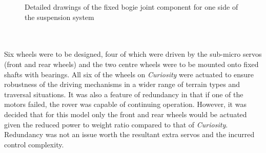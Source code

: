         \begin{figure}[H]
        \centering
        \caption[Detailed drawings of the fixed bogie joint component for one side of the suspension system]{Detailed drawings of the fixed bogie joint component for one side of the suspension system}
        \label{fig:mechDesign-bogieJointFixedDetail}
        \end{figure}
        
      \\\\
        Six wheels were to be designed, four of which were driven by the sub-micro servos (front and rear wheels) and the two centre wheels were to be mounted onto fixed shafts with bearings. All six of the wheels on \textit{Curiosity} were actuated to ensure robustness of the driving mechanisms in a wider range of terrain types and traversal situations. It was also a feature of redundancy in that if one of the motors failed, the rover was capable of continuing operation. However, it was decided that for this model only the front and rear wheels would be actuated given the reduced power to weight ratio compared to that of \textit{Curiosity}. Redundancy was not an issue worth the resultant extra servos and the incurred control complexity.
        
